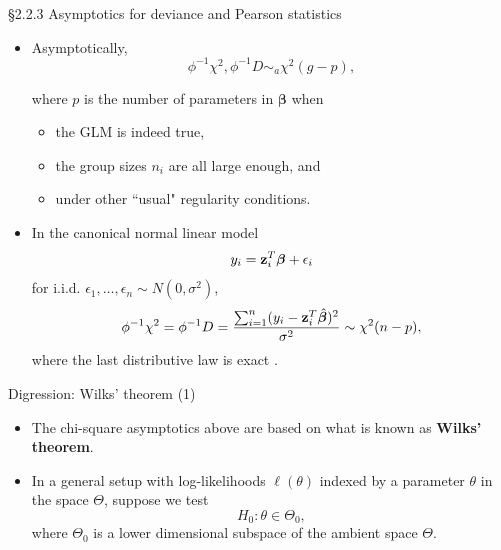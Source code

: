 \documentclass{beamer}
\newcommand{\boldbeta}{{\boldsymbol \beta}}
\newenvironment{wideitemize}%
  {\begin{itemize}%
    \setlength{\parskip}{1em}}%
  {\end{itemize}}
\begin{document}
\begin{frame}{\S2.2.3  Asymptotics for deviance and Pearson statistics  }
\begin{wideitemize}

\item
Asymptotically, 
\[
\phi^{-1}\chi^2, \phi^{-1}D\sim_a\chi^2(g-p),
\] 

where $p$ is the number of parameters in $\boldbeta$ 
when
\begin{itemize}
\item  the GLM  is indeed true,
\item the group sizes $n_i$ are all large enough, and 
\item under other ``usual" regularity conditions.
\end{itemize}


\item In the canonical normal linear model 
\[
y_i  = {\bf z}_i^T \boldbeta + \epsilon_i
\]
for i.i.d. $\epsilon_1, \dots, \epsilon_n \sim N(0, \sigma^2)$,
\[
\phi^{-1}\chi^2= \phi^{-1}D = \frac{ \sum_{i=1}^n(y_i-{\bf z}_i^T \hat{\boldbeta})^2}{\sigma^2} \sim \chi^2 (n - p),
\]
where the last distributive law is exact  \cite[Sec 4]{SeberLee2003}.

\end{wideitemize}
\end{frame}


\begin{frame}{Digression: Wilks' theorem (1) }
\begin{wideitemize}

\item
The chi-square asymptotics above are based on what is known as {\bf Wilks' theorem}.


\item In a general setup with log-likelihoods $\ell(\theta)$ indexed by a parameter $\theta$ in the space $\Theta$, suppose we test
\[
H_0: \theta \in \Theta_0 ,
\]
 where $\Theta_0$ is a lower dimensional subspace of the ambient space $\Theta$.





\end{wideitemize}
\end{frame}
\end{document}
